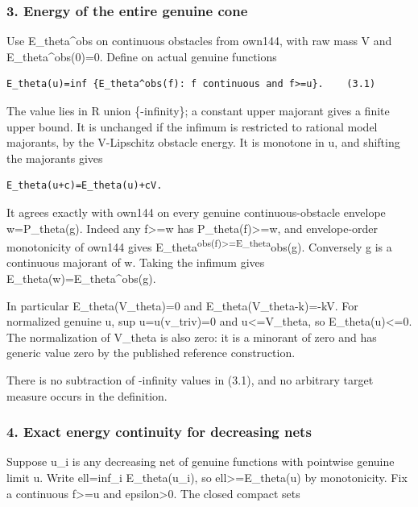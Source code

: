 \documentclass[
  10pt,
]{article}
\begin{document}
\subsubsection{3. Energy of the entire genuine
cone}\label{energy-of-the-entire-genuine-cone}

Use E\_theta\^{}obs on continuous obstacles from own144, with raw mass V
and E\_theta\^{}obs(0)=0. Define on actual genuine functions

\begin{verbatim}
E_theta(u)=inf {E_theta^obs(f): f continuous and f>=u}.    (3.1)
\end{verbatim}

The value lies in R union \{-infinity\}; a constant upper majorant gives
a finite upper bound. It is unchanged if the infimum is restricted to
rational model majorants, by the V-Lipschitz obstacle energy. It is
monotone in u, and shifting the majorants gives

\begin{verbatim}
E_theta(u+c)=E_theta(u)+cV.
\end{verbatim}

It agrees exactly with own144 on every genuine continuous-obstacle
envelope w=P\_theta(g). Indeed any f\textgreater=w has
P\_theta(f)\textgreater=w, and envelope-order monotonicity of own144
gives E\_theta\textsuperscript{obs(f)\textgreater=E\_theta}obs(g).
Conversely g is a continuous majorant of w. Taking the infimum gives
E\_theta(w)=E\_theta\^{}obs(g).

In particular E\_theta(V\_theta)=0 and E\_theta(V\_theta-k)=-kV. For
normalized genuine u, sup u=u(v\_triv)=0 and u\textless=V\_theta, so
E\_theta(u)\textless=0. The normalization of V\_theta is also zero: it
is a minorant of zero and has generic value zero by the published
reference construction.

There is no subtraction of -infinity values in (3.1), and no arbitrary
target measure occurs in the definition.

\subsubsection{4. Exact energy continuity for decreasing
nets}\label{exact-energy-continuity-for-decreasing-nets}

Suppose u\_i is any decreasing net of genuine functions with pointwise
genuine limit u. Write ell=inf\_i E\_theta(u\_i), so
ell\textgreater=E\_theta(u) by monotonicity. Fix a continuous
f\textgreater=u and epsilon\textgreater0. The closed compact sets
\end{document}
